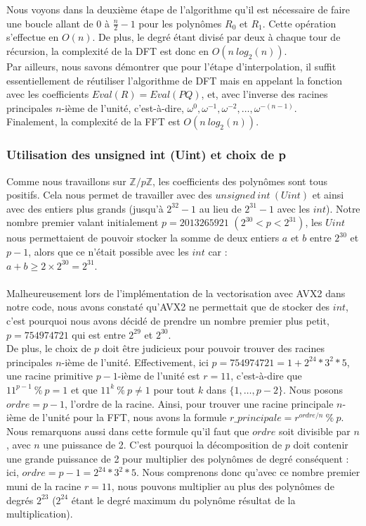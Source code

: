 \documentclass[12pt, a4paper]{article}
\begin{document}
Nous voyons dans la deuxième étape de l'algorithme qu'il est nécessaire de faire une boucle allant de 0 à $\frac{n}{2}-1$ pour les polynômes $R_0$ et $R_1$. Cette opération s'effectue en $O(n)$. De plus, le degré étant divisé par deux à chaque tour de récursion, la complexité de la DFT est donc en $O(n\ log_2(n))$. \\
\indent Par ailleurs, nous savons démontrer que pour l'étape d'interpolation, il suffit essentiellement de réutiliser l'algorithme de DFT mais en appelant la fonction avec les coefficients $Eval(R)=Eval(PQ)$, et, avec l'inverse des racines principales $n$-ième de l'unité, c'est-à-dire, $\omega^{0},\omega^{-1},\omega^{-2},\dots,\omega^{-(n-1)}$. \\
Finalement, la complexité de la FFT est $O(n\ log_2(n))$.

\subsubsection{Utilisation des unsigned int (Uint) et choix de p}

Comme nous travaillons sur $\mathbb{Z}/p\mathbb{Z}$, les coefficients des polynômes sont tous positifs. Cela nous permet de travailler avec des $unsigned\ int\ (Uint)$ et ainsi avec des entiers plus grands (jusqu’à $2^{32}-1$ au lieu de $2^{31}-1$ avec les $int$). Notre nombre premier valant initialement \linebreak $p=2013265921$ $(2^{30} < p < 2^{31})$, les $Uint$ nous permettaient de pouvoir stocker la somme de deux entiers $a$ et $b$ entre $2^{30}$ et $p-1$, alors que ce n'était possible avec les $int$ car : \\ $a+b\geq2\times2^{30}=2^{31}$. \\ \\
\indent Malheureusement lors de l'implémentation de la vectorisation avec AVX2 dans notre code, nous avons constaté qu'AVX2 ne permettait que de stocker des $int$, c'est pourquoi nous avons décidé de prendre un nombre premier plus petit, $p=754974721$ qui est entre $2^{29}$ et  $2^{30}$. \\
\indent De plus, le choix de $p$ doit être judicieux pour pouvoir trouver des racines principales $n$-ième de l'unité. Effectivement, ici $p = 754974721 = 1+2^{24}*3^2*5$, une racine primitive $p-1$-ième de l'unité est $r = 11$, c'est-à-dire que $11^{p-1}\ \%\ p = 1$ et que $11^{k}\ \%\ p \ne 1$ pour tout $k$ dans $\{1,\dots,p-2\}$. Nous posons $ordre = p-1$, l'ordre de la racine. Ainsi, pour trouver une racine principale $n$-ième de l'unité pour la FFT, nous avons la formule $r\_principale = r^{ordre/n}\ \% \ p$. \\
\indent Nous remarquons aussi dans cette formule qu'il faut que $ordre$ soit divisible par $n$, avec $n$ une puissance de 2. C'est pourquoi la décomposition de $p$ doit contenir une grande puissance de 2 pour multiplier des polynômes de degré conséquent : ici, $ordre = p-1 = 2^{24}*3^2*5$. Nous comprenons donc qu'avec ce nombre premier muni de la racine $r = 11$, nous pouvons multiplier au plus des polynômes de degrés $2^{23}$ ($2^{24}$ étant le degré maximum du polynôme résultat de la multiplication).
\end{document}
